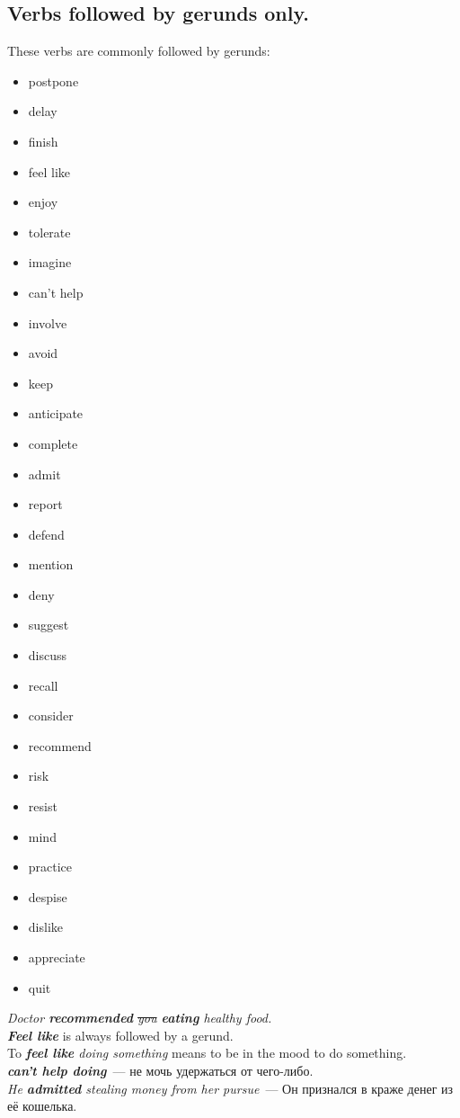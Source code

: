 \documentclass[10pt,a4paper]{article}
\newcommand\ex[1]{\textit{\textbf{{#1}}}}           %
\begin{document}
\subsection{Verbs followed by gerunds only.} \label{sed:Verbs_followed_by_gerunds}
These verbs are commonly followed by gerunds:
\vspace{-4\parskip}
\begin{multicols}{4}
\begin{itemize}[leftmargin=3.05mm]
  \item postpone
  \item delay
  \item finish
  \item feel like
  \item enjoy
  \item tolerate
  \item imagine
  \item can't help
  \item involve
  \item avoid
  \item keep
  \item anticipate
  \item complete
  \item admit
  \item report
  \item defend
  \item mention
  \item deny
  \item suggest
  \item discuss
  \item recall
  \item consider
  \item recommend
  \item risk
  \item resist
  \item mind
  \item practice
  \item despise
  \item dislike
  \item appreciate
  \item quit
\end{itemize}
\end{multicols}
\vspace{-5\parskip}
\textit{Doctor \ex{recommended} \sout{you} \ex{eating} healthy food.}\\
\ex{Feel like} is always followed by a gerund.\\
To \textit{\ex{feel like} doing something} means to be in the mood to do something.\\
\ex{can't help doing}~--- не мочь удержаться от чего-либо.\\
\textit{He \ex{admitted} stealing money from her pursue}~--- Он признался в краже денег из её кошелька.
\end{document}
